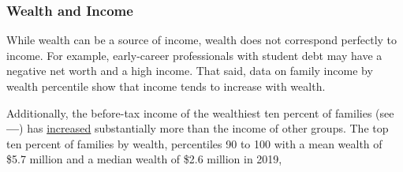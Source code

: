 \documentclass{report}
\begin{document}
{\begin{minipage}{0.76\textwidth}
\subsubsection*{Wealth and Income}
\small While wealth can be a source of income, wealth does not correspond perfectly to income. For example, early-career professionals with student debt may have a negative net worth and a high income. That said, data on family income by wealth percentile show that income tends to increase with wealth. 

Additionally, the before-tax income of the wealthiest ten percent of families (see {\color{blue!80!cyan!80!black}\textbf{---}}) has \href{https://www.federalreserve.gov/econres/scf/dataviz/scf/chart/#series:Before_Tax_Income;demographic:nwcat;population:1,2,3,4,5;units:median}{increased} substantially more than the income of other groups. The top ten percent of families by wealth, percentiles 90 to 100 with a mean wealth of \$5.7 million and a median wealth of \$2.6 million in 2019,  
\end{minipage}
\vspace{1mm}

}
\end{document}
